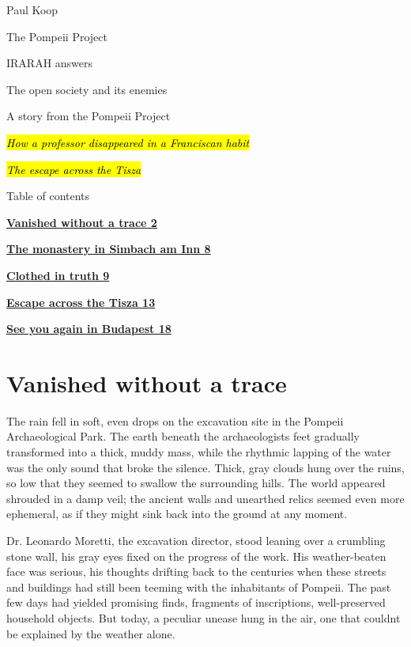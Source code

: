 \documentclass[
]{article}
\author{}
\date{}
\begin{document}
{
\setcounter{tocdepth}{3}
\tableofcontents
}
Paul Koop

The Pompeii Project

IRARAH answers

The open society and its enemies

A story from the Pompeii Project

\emph{\hl{How a professor disappeared in a Franciscan habit}}

\emph{\hl{The escape across the Tisza}}

Table of contents

\hyperref[vanished-without-a-trace]{\textbf{Vanished without a trace 2}}

\hyperref[the-monastery-in-simbach-am-inn]{\textbf{The monastery in Simbach am Inn 8}}

\hyperref[clothed-in-truth]{\textbf{Clothed in truth 9}}

\hyperref[escape-across-the-tisza]{\textbf{Escape across the Tisza 13}}

\hyperref[see-you-again-in-budapest]{\textbf{See you again in Budapest 18}}

\section{Vanished without a trace}\label{vanished-without-a-trace}

The rain fell in soft, even drops on the excavation site in the Pompeii Archaeological Park. The earth beneath the archaeologists\textquotesingle{} feet gradually transformed into a thick, muddy mass, while the rhythmic lapping of the water was the only sound that broke the silence. Thick, gray clouds hung over the ruins, so low that they seemed to swallow the surrounding hills. The world appeared shrouded in a damp veil; the ancient walls and unearthed relics seemed even more ephemeral, as if they might sink back into the ground at any moment.

Dr. Leonardo Moretti, the excavation director, stood leaning over a crumbling stone wall, his gray eyes fixed on the progress of the work. His weather-beaten face was serious, his thoughts drifting back to the centuries when these streets and buildings had still been teeming with the inhabitants of Pompeii. The past few days had yielded promising finds, fragments of inscriptions, well-preserved household objects. But today, a peculiar unease hung in the air, one that couldn\textquotesingle t be explained by the weather alone.
\end{document}
